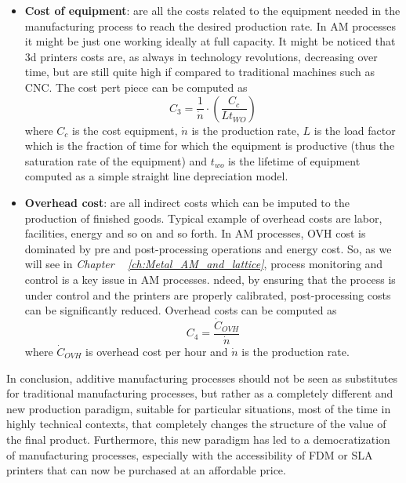 \begin{itemize}
    \item \textbf{Cost of equipment}: are all the costs related to the equipment needed in the manufacturing process to reach the desired production rate. In AM processes it might be just one working ideally at full capacity. It might be noticed that 3d printers costs are, as always in technology revolutions, decreasing over time, but are still quite high if compared to traditional machines such as CNC. The cost pert piece can be computed as
    \begin{equation}\label{eq:cost_equipment}
        C_3 = \frac{1}{\dot{n}} \cdot \left( \frac{C_c}{Lt_{WO}}\right)
    \end{equation}
    where $C_c$ is the cost equipment, $\dot{n}$ is the production rate, $L$ is the load factor which is the fraction of time for which the equipment is productive (thus the saturation rate of the equipment) and $t_{wo}$ is the lifetime of equipment computed as a simple straight line depreciation model.
    \item \textbf{Overhead cost}: are all indirect costs which can be imputed to the production of finished goods. Typical example of overhead costs are labor, facilities, energy and so on and so forth. In AM processes, OVH cost is dominated by pre and post-processing operations and energy cost. So, as we will see in \textit{Chapter ~ \ref{ch:Metal_AM_and_lattice}}, process monitoring and control is a key issue in AM processes. ndeed, by ensuring that the process is under control and the printers are properly calibrated, post-processing costs can be significantly reduced. Overhead costs can be computed as
    \begin{equation}\label{eq:OVH_cost}
        C_4 = \frac{\dot{C}_{OVH}}{\dot{n}}
    \end{equation}
    where $\dot{C}_{OVH}$ is overhead cost per hour and $\dot{n}$ is the production rate.
    \end{itemize}

In conclusion, additive manufacturing processes should not be seen as substitutes for traditional manufacturing processes, but rather as a completely different and new production paradigm, suitable for particular situations, most of the time in highly technical contexts, that completely changes the structure of the value of the final product. Furthermore, this new paradigm has led to a democratization of manufacturing processes, especially with the accessibility of FDM or SLA printers that can now be purchased at an affordable price.